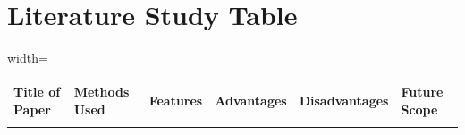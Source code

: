 \documentclass{article}
\begin{document}
\section{Literature Study Table}


\small
\begin{adjustbox}{width=\textwidth}
\begin{tabular}{|p{}|p{}|p{}|p{}|p{}|p{}|}
    \hline
    \rowcolor[HTML]{D3D3D3}
    \textbf{Title of Paper} & \textbf{Methods Used} & \textbf{Features} & \textbf{Advantages} & \textbf{Disadvantages}  & \textbf{Future Scope} \\
    \hline
    \vspace{0.1in}
    

\end{tabular}
\end{adjustbox}
\end{document}
